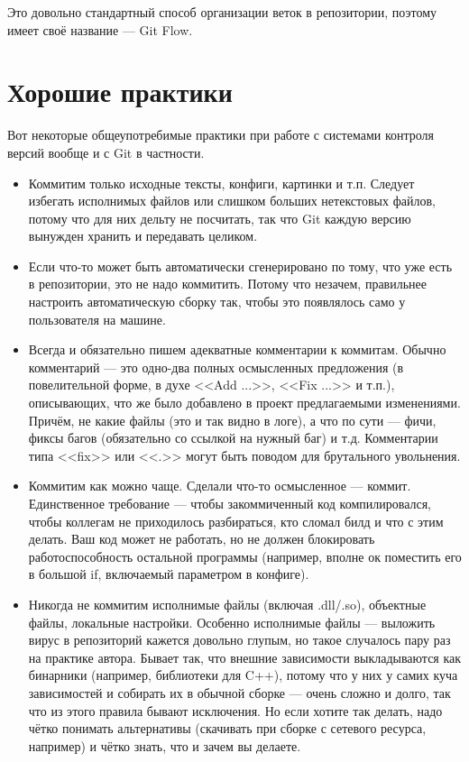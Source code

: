 \documentclass{../text-style}
\begin{document}
Это довольно стандартный способ организации веток в репозитории, поэтому имеет своё название --- Git Flow.

\section{Хорошие практики}

Вот некоторые общеупотребимые практики при работе с системами контроля версий вообще и с Git в частности.

\begin{itemize}
    \item Коммитим только исходные тексты, конфиги, картинки и т.п. Следует избегать исполнимых файлов или слишком больших нетекстовых файлов, потому что для них дельту не посчитать, так что Git каждую версию вынужден хранить и передавать целиком.
    \item Если что-то может быть автоматически сгенерировано по тому, что уже есть в репозитории, это не надо коммитить. Потому что незачем, правильнее настроить автоматическую сборку так, чтобы это появлялось само у пользователя на машине.
    \item Всегда и обязательно пишем адекватные комментарии к коммитам. Обычно комментарий --- это одно-два полных осмысленных предложения (в повелительной форме, в духе <<Add ...>>, <<Fix ...>> и т.п.), описывающих, что же было добавлено в проект предлагаемыми изменениями. Причём, не какие файлы (это и так видно в логе), а что по сути --- фичи, фиксы багов (обязательно со ссылкой на нужный баг) и т.д. Комментарии типа <<fix>> или <<.>> могут быть поводом для брутального увольнения.
    \item Коммитим как можно чаще. Сделали что-то осмысленное --- коммит. Единственное требование --- чтобы закоммиченный код компилировался, чтобы коллегам не приходилось разбираться, кто сломал билд и что с этим делать. Ваш код может не работать, но не должен блокировать работоспособность остальной программы (например, вполне ок поместить его в большой if, включаемый параметром в конфиге).
    \item Никогда не коммитим исполнимые файлы (включая .dll/.so), объектные файлы, локальные настройки. Особенно исполнимые файлы --- выложить вирус в репозиторий кажется довольно глупым, но такое случалось пару раз на практике автора. Бывает так, что внешние зависимости выкладываются как бинарники (например, библиотеки для C++), потому что у них у самих куча зависимостей и собирать их в обычной сборке --- очень сложно и долго, так что из этого правила бывают исключения. Но если хотите так делать, надо чётко понимать альтернативы (скачивать при сборке с сетевого ресурса, например) и чётко знать, что и зачем вы делаете.

\end{itemize}
\end{document}

